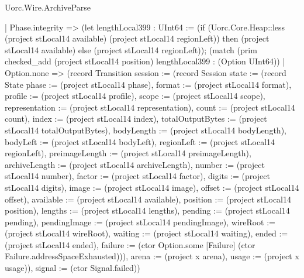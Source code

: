 \begin{lexlean}{Uorc.Wire.ArchiveParse}
\begin{semanticmodule}
{        | Phase.integrity => (let lengthLocal399 : UInt64 := (if (Uorc.Core.Heap::less (project stLocal14 available) (project stLocal14 regionLeft)) then (project stLocal14 available) else (project stLocal14 regionLeft)); (match (prim checked_add (project stLocal14 position) lengthLocal399 : (Option UInt64))
          | Option.none => (record Transition {session := (record Session {state := (record State {phase := (project stLocal14 phase), format := (project stLocal14 format), profile := (project stLocal14 profile), scope := (project stLocal14 scope), representation := (project stLocal14 representation), count := (project stLocal14 count), index := (project stLocal14 index), totalOutputBytes := (project stLocal14 totalOutputBytes), bodyLength := (project stLocal14 bodyLength), bodyLeft := (project stLocal14 bodyLeft), regionLeft := (project stLocal14 regionLeft), preimageLength := (project stLocal14 preimageLength), archiveLength := (project stLocal14 archiveLength), number := (project stLocal14 number), factor := (project stLocal14 factor), digits := (project stLocal14 digits), image := (project stLocal14 image), offset := (project stLocal14 offset), available := (project stLocal14 available), position := (project stLocal14 position), lengths := (project stLocal14 lengths), pending := (project stLocal14 pending), pendingImage := (project stLocal14 pendingImage), wireRoot := (project stLocal14 wireRoot), waiting := (project stLocal14 waiting), ended := (project stLocal14 ended), failure := (ctor Option.some [Failure] (ctor Failure.addressSpaceExhausted))}), arena := (project x arena), usage := (project x usage)}), signal := (ctor Signal.failed)})
}
\end{semanticmodule}
\end{lexlean}
